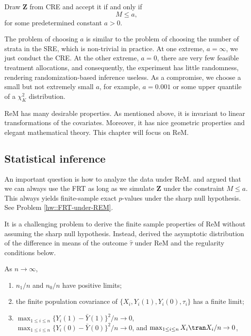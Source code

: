 \begin{definition}
[ReM]
Draw $\bm{Z}$ from CRE and accept it if and only if 
$$
M \leq a,
$$  
for some predetermined constant $a > 0$. 
\end{definition}



The problem of choosing $a$ is similar to the problem of choosing the number of strata in the SRE, which is non-trivial in practice. At one extreme, $a = \infty$, we just conduct the CRE. At the other extreme, $a=0$, there are very few feasible treatment allocations, and consequently, the experiment has little randomness, rendering randomization-based inference useless. As a compromise, we choose a small but not extremely small $a$, for example, $a=0.001$ or some upper quantile of a $\chi^2_K$ distribution. 


 

ReM has many desirable properties. As mentioned above, it is invariant to linear transformations of the covariates. Moreover, it has nice geometric properties and elegant mathematical theory. This chapter will focus on ReM.  


\subsection{Statistical inference}

An important question is how to analyze the data under ReM. \citet{bruhn2009pursuit} and \citet{morgan2012rerandomization} argued that we can always use the FRT as long as we simulate $\bm{Z}$ under the constraint $M\leq a$. This always yields finite-sample exact $p$-values under the sharp null hypothesis. See Problem \ref{hw::FRT-under-REM}. 


It is a challenging problem to derive the finite sample properties of ReM without assuming the sharp null hypothesis. Instead, \citet{li2018asymptotic} derived the asymptotic distribution of the difference in means of the outcome $\hat{\tau}$ under ReM and the regularity conditions below.



\begin{condition}\label{condition::regularity-cre-rem}
As $n\rightarrow \infty$,
\begin{enumerate}
\item 
$n_1/n$ and $n_0/n$ have positive limits;
\item 
the finite population covariance of $\{  X_i, Y_i(1), Y_i(0), \tau_i \}$ has a finite limit;
\item
$\max_{1\leq i \leq n}  \{   Y_i(1) - \bar{Y}(1) \} ^2/n \rightarrow 0 $,
$\max_{1\leq i \leq n}  \{   Y_i(0) - \bar{Y}(0) \}^2/n \rightarrow 0 $,
and $\max_{1\leq i \leq n}   X_i \tran X_i/n \rightarrow 0 $,
\end{enumerate}
\end{condition} 


